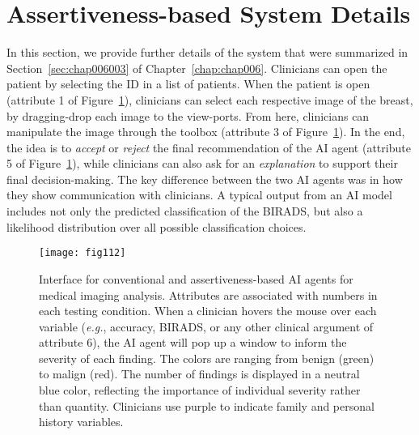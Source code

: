 \section{Assertiveness-based System Details}
\label{sec:app005004}

In this section, we provide further details of the system that were summarized in Section~\ref{sec:chap006003} of Chapter~\ref{chap:chap006}.
Clinicians can open the patient by selecting the ID in a list of patients.
When the patient is open (attribute 1 of Figure~\ref{fig:fig112}), clinicians can select each respective image of the breast, by dragging-drop each image to the view-ports.
From here, clinicians can manipulate the image through the toolbox (attribute 3 of Figure~\ref{fig:fig112}).
In the end, the idea is to {\it accept} or {\it reject} the final recommendation of the AI agent (attribute 5 of Figure~\ref{fig:fig112}), while clinicians can also ask for an {\it explanation} to support their final decision-making.
The key difference between the two AI agents was in how they show communication with clinicians.
A typical output from an AI model includes not only the predicted classification of the BIRADS, but also a likelihood distribution over all possible classification choices.

\begin{figure}[htpb]
\centering
\texttt{[image: fig112]}
\caption[]{Interface for conventional and assertiveness-based AI agents for medical imaging analysis. Attributes are associated with numbers in each testing condition. When a clinician hovers the mouse over each variable ({\it e.g.}, accuracy, BIRADS, or any other clinical argument of attribute 6), the AI agent will pop up a window to inform the severity of each finding. The colors are ranging from benign (green) to malign (red). The number of findings is displayed in a neutral blue color, reflecting the importance of individual severity rather than quantity. Clinicians use purple to indicate family and personal history variables.}
\label{fig:fig112}
\end{figure}


